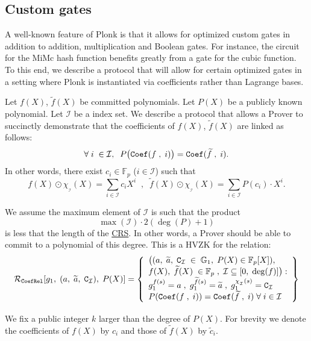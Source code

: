 \documentclass[11pt, lettersize, notitlepage, leqno, footskip=0.6cm]{article}
\newcommand{\bFp}{\mathbb{F}_p}
\newcommand{\wti}{\widetilde}
\newcommand{\mc}{\mathcal}
\newcommand{\mb}{\mathbb}
\newcommand{\sub}{\subseteq}
\newcommand{\vs}{\vspace{-0.15cm}}
\newcommand{\noin}{\noindent}
\numberwithin{equation}{section}
\begin{document}
\subsection{\fontsize{11}{11}\selectfont Custom gates}

A well-known feature of Plonk is that it allows for optimized custom gates in addition to addition, multiplication and Boolean gates. For instance, the circuit for the MiMc hash function benefits greatly from a gate for the cubic function. To this end, we describe a protocol that will allow for certain optimized gates in a setting where Plonk is instantiated via coefficients rather than Lagrange bases.

Let $f(X)$, $\wti{f}(X)$ be committed polynomials. Let $P(X)$ be a publicly known polynomial. Let $\mc{I}$ be a index set. We describe a protocol that allows a Prover to succinctly demonstrate that the coefficients of $f(X)$, $\wti{f}(X)$ are linked as follows: \vs $$ \forall\;i\;\in\mc{I},\;\;P\big({\tt{Coef}}(f\;,\;i)\big) = {\tt{Coef}}(\wti{f}\;,\;i).$$ In other words, there exist $c_i\in \bFp$ ($i\in \mc{I}$) such that \vs $$f(X)\odot \chi_{_{\mc{I}}}(X) = \sum\limits_{i\in \mc{I}} c_iX^i\;\;,\;\; \wti{f}(X)\odot \chi_{_{\mc{I}}}(X) = \sum\limits_{i\in \mc{I}} P(c_i)\cdot X^i.    $$ 
 

\noin \hypertarget{CoefRel}{We} assume the maximum element of $\mc{I}$ is such that the product \vs $$\max(\mc{I})\cdot 2(\deg(P)+1) $$ is less that the length of the \hyperlink{CRS}{CRS}. In other words, a Prover should be able to commit to a polynomial of this degree. This is a HVZK for the relation: $$\mc{R}_{\tt{CoefRel}}[g_1,\;(a,\;\wti{a},\; {\tt{C}}_{\mc{I}} ),\; P(X)] = \left\{\begin{array}{l} \big((a,\;  \wti{a},\;{\tt{C}}_{\mc{I}}\;\in\;\mb{G}_1,\; P(X)\in \bFp[X]),\\
f(X),\;\wti{f}(X)\;\in \bFp\;,\; \mc{I} \sub [0,\;\deg(f)]\big): \\
g_1^{f(s)} = a\;,\;g_1^{\wti{f}(s)} = \wti{a}\;,\;g_1^{\chi_{_{\mc{I}}}(s)} = \tt{C}_{\mc{I}} \\ \vspace{0.5mm}
P({\tt{Coef}}(f\;,\; i)) = {\tt{Coef}}(\wti{f}\;,\; i) \;\forall\; i\in \mc{I}\\

\end{array}\right\}  $$


We fix a public integer $k$ larger than the degree of $P(X)$. For brevity we denote the coefficients of $f(X)$ by $c_i$ and those of $\wti{f}(X)$ by $\wti{c}_i$.\bigskip
\end{document}
